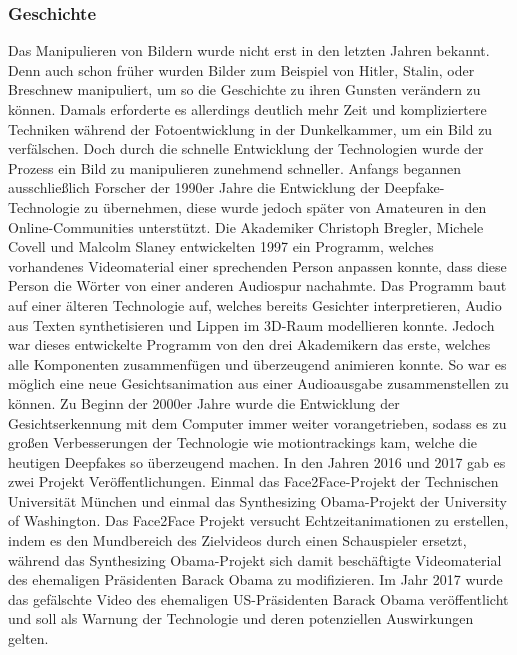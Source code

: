 \subsubsection{Geschichte}
Das Manipulieren von Bildern wurde nicht erst in den letzten Jahren bekannt. Denn auch schon früher wurden Bilder zum Beispiel von Hitler, Stalin, oder Breschnew manipuliert, um so die Geschichte zu ihren Gunsten verändern zu können.
Damals erforderte es allerdings deutlich mehr Zeit und kompliziertere Techniken während der Fotoentwicklung in der Dunkelkammer, um ein Bild zu verfälschen. Doch durch die schnelle Entwicklung der Technologien wurde der Prozess ein Bild zu manipulieren zunehmend schneller.
Anfangs begannen ausschließlich Forscher der 1990er Jahre die Entwicklung der Deepfake-Technologie zu übernehmen, diese wurde jedoch später von Amateuren in den Online-Communities unterstützt.
Die Akademiker Christoph Bregler, Michele Covell und Malcolm Slaney entwickelten 1997 ein Programm, welches vorhandenes Videomaterial einer sprechenden Person anpassen konnte, dass diese Person die Wörter von einer anderen Audiospur nachahmte.
Das Programm baut auf einer älteren Technologie auf, welches bereits Gesichter interpretieren, Audio aus Texten synthetisieren und Lippen im 3D-Raum modellieren konnte.
Jedoch war dieses entwickelte Programm von den drei Akademikern das erste, welches alle Komponenten zusammenfügen und überzeugend animieren konnte. So war es möglich eine neue Gesichtsanimation aus einer Audioausgabe zusammenstellen zu können.\newline
Zu Beginn der 2000er Jahre wurde die Entwicklung der Gesichtserkennung mit dem Computer immer weiter vorangetrieben,
sodass es zu großen Verbesserungen der Technologie wie \glspl{motiontracking} kam, welche die heutigen Deepfakes so
überzeugend machen.\newline
In den Jahren 2016 und 2017 gab es zwei Projekt Veröffentlichungen. Einmal das Face2Face-Projekt der Technischen Universität München und einmal das Synthesizing Obama-Projekt der University of Washington. \newline
Das Face2Face Projekt versucht Echtzeitanimationen zu erstellen, indem es den Mundbereich des Zielvideos durch einen Schauspieler ersetzt, während das Synthesizing Obama-Projekt sich damit beschäftigte Videomaterial des ehemaligen Präsidenten Barack Obama zu modifizieren.\cite{ResearchGate}\newline
Im Jahr 2017 wurde das gefälschte Video des ehemaligen US-Präsidenten Barack Obama veröffentlicht und soll als Warnung der Technologie und deren potenziellen Auswirkungen gelten.

